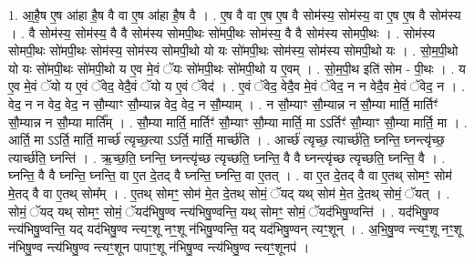 \documentclass[17pt]{extarticle}
\begin{document}
1. आ॒है॒ष ए॒ष आ॑हा है॒ष वै वा ए॒ष आ॑हा है॒ष वै । . ए॒ष वै वा ए॒ष ए॒ष वै सोम॑स्य॒ सोम॑स्य॒ वा ए॒ष ए॒ष वै सोम॑स्य । . वै सोम॑स्य॒ सोम॑स्य॒ वै वै सोम॑स्य सोमपी॒थः सो॑मपी॒थः सोम॑स्य॒ वै वै सोम॑स्य सोमपी॒थः । . सोम॑स्य सोमपी॒थः सो॑मपी॒थः सोम॑स्य॒ सोम॑स्य सोमपी॒थो यो यः सो॑मपी॒थः सोम॑स्य॒ सोम॑स्य सोमपी॒थो यः । . सो॒म॒पी॒थो यो यः सो॑मपी॒थः सो॑मपी॒थो य ए॒व मे॒वं ॅयः सो॑मपी॒थः सो॑मपी॒थो य ए॒वम् । . सो॒म॒पी॒थ इति॑ सोम - पी॒थः । . य ए॒व मे॒वं ॅयो य ए॒वं ॅवेद॒ वेदै॒वं ॅयो य ए॒वं ॅवेद॑ । . ए॒वं ॅवेद॒ वेदै॒व मे॒वं ॅवेद॒ न न वेदै॒व मे॒वं ॅवेद॒ न । . वेद॒ न न वेद॒ वेद॒ न सौ॒म्याꣳ सौ॒म्यान्न वेद॒ वेद॒ न सौ॒म्याम् । . न सौ॒म्याꣳ सौ॒म्यान्न न सौ॒म्या मार्ति॒ मार्तिꣳ॑ सौ॒म्यान्न न सौ॒म्या मार्ति᳚म् । . सौ॒म्या मार्ति॒ मार्तिꣳ॑ सौ॒म्याꣳ सौ॒म्या मार्ति॒ मा ऽऽर्तिꣳ॑ सौ॒म्याꣳ सौ॒म्या मार्ति॒ मा । . आर्ति॒ मा ऽऽर्ति॒ मार्ति॒ मार्च्छ॑ त्यृच्छ॒त्या ऽऽर्ति॒ मार्ति॒ मार्च्छ॑ति । . आर्च्छ॑ त्यृच्छ॒ त्यार्च्छ॑ति॒ घ्नन्ति॒ घ्नन्त्यृ॑च्छ॒ त्यार्च्छ॑ति॒ घ्नन्ति॑ । . ऋ॒च्छ॒ति॒ घ्नन्ति॒ घ्नन्त्यृ॑च्छ त्यृच्छति॒ घ्नन्ति॒ वै वै घ्नन्त्यृ॑च्छ त्यृच्छति॒ घ्नन्ति॒ वै । . घ्नन्ति॒ वै वै घ्नन्ति॒ घ्नन्ति॒ वा ए॒त दे॒तद् वै घ्नन्ति॒ घ्नन्ति॒ वा ए॒तत् । . वा ए॒त दे॒तद् वै वा ए॒तथ् सोमꣳ॒॒ सोम॑ मे॒तद् वै वा ए॒तथ् सोम᳚म् । . ए॒तथ् सोमꣳ॒॒ सोम॑ मे॒त दे॒तथ् सोमं॒ ॅयद् यथ् सोम॑ मे॒त दे॒तथ् सोमं॒ ॅयत् । . सोमं॒ ॅयद् यथ् सोमꣳ॒॒ सोमं॒ ॅयद॑भिषु॒ण्व न्त्य॑भिषु॒ण्वन्ति॒ यथ् सोमꣳ॒॒ सोमं॒ ॅयद॑भिषु॒ण्वन्ति॑ । . यद॑भिषु॒ण्व न्त्य॑भिषु॒ण्वन्ति॒ यद् यद॑भिषु॒ण्व न्त्यꣳ॒॒शू नꣳ॒॒शू न॑भिषु॒ण्वन्ति॒ यद् यद॑भिषु॒ण्वन् त्यꣳ॒॒शून् । . अ॒भि॒षु॒ण्व न्त्यꣳ॒॒शू नꣳ॒॒शू न॑भिषु॒ण्व न्त्य॑भिषु॒ण्व न्त्यꣳ॒॒शून पापाꣳ॒॒शू न॑भिषु॒ण्व
न्त्य॑भिषु॒ण्व न्त्यꣳ॒॒शूनप॑ । \newline
\end{document}
